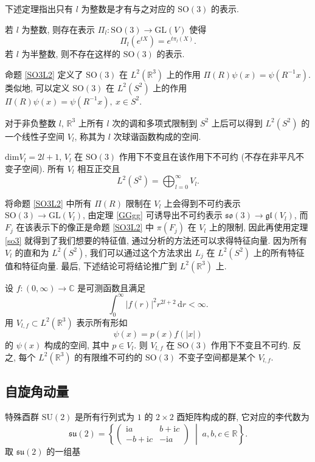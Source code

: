 下述定理指出只有 $ l $ 为整数是才有与之对应的 $ \mathrm{SO}(3) $ 的表示.

\begin{proposition}
    若 $ l $ 为整数, 则存在表示 $ \Pi_l:\mathrm{SO}(3)\to\mathrm{GL}(V) $ 使得
    \[ \Pi_l\left(e^{tX}\right)=e^{t\pi_l(X)}. \]
    若 $ l $ 为半整数, 则不存在这样的 $ \mathrm{SO}(3) $ 的表示.
\end{proposition}

命题 \ref{SO3L2} 定义了 $ \mathrm{SO}(3) $ 在 $ L^2(\mathbb{R}^3) $ 上的作用 $ \Pi(R)\psi(x)=\psi(R^{-1}x) $. 类似地, 可以定义 $ \mathrm{SO}(3) $ 在 $ L^2(S^2) $ 上的作用 $ \Pi(R)\psi(x)=\psi(R^{-1}x),\ x\in S^2 $.

\begin{definition}
    对于非负整数 $ l $, $ \mathbb{R}^3 $ 上所有 $ l $ 次的调和多项式限制到 $ S^2 $ 上后可以得到 $ L^2(S^2) $ 的一个线性子空间 $ V_l $, 称其为 $ l $ 次球谐函数构成的空间.
\end{definition}

\begin{proposition}
    $ \mathrm{dim}V_l=2l+1 $, $ V_l $ 在 $ \mathrm{SO}(3) $ 作用下不变且在该作用下不可约 (不存在非平凡不变子空间). 所有 $ V_l $ 相互正交且
    \[ L^2(S^2)=\bigoplus_{l=0}^\infty V_l. \]
\end{proposition}

将命题 \ref{SO3L2} 中所有 $ \Pi(R) $ 限制在 $ V_l $ 上会得到不可约表示 $ \mathrm{SO}(3)\to \mathrm{GL}(V_l) $, 由定理 \ref{GGgg} 可诱导出不可约表示 $ \mathfrak{so}(3)\to\mathfrak{gl}(V_l) $, 而 $ F_j $ 在该表示下的像正是命题 \ref{SO3L2} 中 $ \pi(F_j) $ 在 $ V_l $ 上的限制, 因此再使用定理 \ref{so3} 就得到了我们想要的特征值, 通过分析的方法还可以求得特征向量. 因为所有 $ V_l $ 的直和为 $ L^2(S^2) $, 我们可以通过这个方法求出 $ L_j $ 在 $ L^2(S^2) $ 上的所有特征值和特征向量. 最后, 下述结论可将结论推广到 $ L^2(\mathbb{R}^3) $ 上.

\begin{proposition}
    设 $ f:(0,\infty)\to\mathbb{C} $ 是可测函数且满足
    \[ \int_{0}^{\infty}|f(r)|^2r^{2l+2}\,\mathrm{d}r<\infty. \]
    用 $ V_{l,f}\subset L^2(\mathbb{R}^3) $ 表示所有形如
    \[ \psi(x)=p(x)f(|x|) \]
    的 $ \psi(x) $ 构成的空间, 其中 $ p\in V_l $. 则 $ V_{l,f} $ 在 $ \mathrm{SO}(3) $ 作用下不变且不可约. 反之, 每个 $ L^2(\mathbb{R}^3) $ 的有限维不可约的 $ \mathrm{SO}(3) $ 不变子空间都是某个 $ V_{l,f} $.     
\end{proposition}

\subsection{自旋角动量}
特殊酉群 $ \mathrm{SU}(2) $ 是所有行列式为 $ 1 $ 的 $ 2\times 2 $ 酉矩阵构成的群, 它对应的李代数为 
\[ \mathfrak{su}(2)=\left\{ \left(\begin{matrix}
    \mathrm{i} a & b+\mathrm{i}c\\ 
    -b+\mathrm{i}c & -\mathrm{i}a
\end{matrix}\right) \;\middle|\; a,b,c\in\mathbb{R} \right\}. \]
取 $ \mathfrak{su}(2) $ 的一组基

